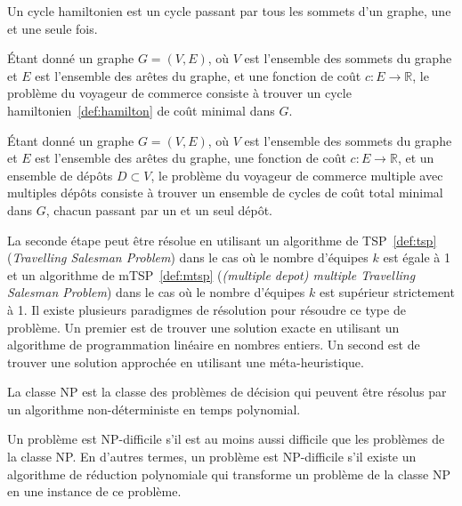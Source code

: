 \documentclass[francais,RandD]{rapportPFE}
\begin{document}
				\begin{Definition}
					\label{def:hamilton}
					Un cycle hamiltonien est un cycle passant par tous les sommets d'un graphe, une et une seule fois.
				\end{Definition}

				\begin{Definition}
					\label{def:tsp}
					Étant donné un graphe $G = (V, E)$, où $V$ est l'ensemble des sommets du graphe et $E$ est l'ensemble des arêtes du graphe, et une fonction de coût $c : E \rightarrow \mathbb{R}$, le problème du voyageur de commerce consiste à trouver un cycle hamiltonien~\ref{def:hamilton} de coût minimal dans $G$.
				\end{Definition}

				\begin{Definition}
					\label{def:mtsp}
					Étant donné un graphe $G = (V, E)$, où $V$ est l'ensemble des sommets du graphe et $E$ est l'ensemble des arêtes du graphe, une fonction de coût $c : E \rightarrow \mathbb{R}$, et un ensemble de dépôts $D \subset V$, le problème du voyageur de commerce multiple avec multiples dépôts consiste à trouver un ensemble de cycles de coût total minimal dans $G$, chacun passant par un et un seul dépôt.
				\end{Definition}

				La seconde étape peut être résolue en utilisant un algorithme de TSP~\ref{def:tsp} (\textit{Travelling Salesman Problem}) dans le cas où le nombre d'équipes $k$ est égale à 1 et un algorithme de mTSP~\ref{def:mtsp} (\textit{(multiple depot) multiple Travelling Salesman Problem}) dans le cas où le nombre d'équipes $k$ est supérieur strictement à 1.
				Il existe plusieurs paradigmes de résolution pour résoudre ce type de problème.
				Un premier est de trouver une solution exacte en utilisant un algorithme de programmation linéaire en nombres entiers.
				Un second est de trouver une solution approchée en utilisant une méta-heuristique.

				\begin{Definition}[Classe NP]
					\label{def:np}
					La classe NP est la classe des problèmes de décision qui peuvent être résolus par un algorithme non-déterministe en temps polynomial.
				\end{Definition}

				\begin{Definition}
					\label{def:nph}
					Un problème est NP-difficile s'il est au moins aussi difficile que les problèmes de la classe NP.
					En d'autres termes, un problème est NP-difficile s'il existe un algorithme de réduction polynomiale qui transforme un problème de la classe NP en une instance de ce problème.
				\end{Definition}
\end{document}
